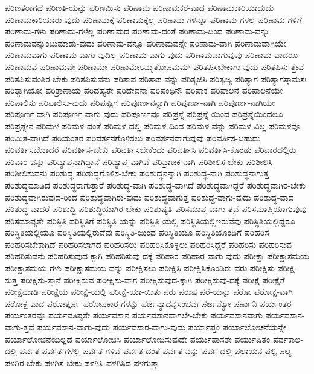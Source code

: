 {ಪರಿಣತರಾಗದೆ
ಪರಿಣತಿ-ಯನ್ನು
ಪರಿಣಮಿಸು
ಪರಿಣಾಮ
ಪರಿಣಾಮಕರ-ವಾದ
ಪರಿಣಾಮಕಾರಿಯಾದುದು
ಪರಿಣಾಮಕಾರಿಯಾರು-ವುದು
ಪರಿಣಾಮಕ್ಕೆ
ಪರಿಣಾಮಕ್ಕೆಲ್ಲ
ಪರಿಣಾಮ-ಗಳನ್ನೂ
ಪರಿಣಾಮ-ಗಳಲ್ಲ
ಪರಿಣಾಮ-ಗಳಿಗೆ
ಪರಿಣಾಮ-ಗಳು
ಪರಿಣಾಮ-ಗಳೆಲ್ಲ
ಪರಿಣಾಮದ
ಪರಿಣಾಮ-ದಂತೆ
ಪರಿಣಾಮ-ದಿಂದ
ಪರಿಣಾಮ-ವನ್ನು
ಪರಿಣಾಮವನ್ನುಂಟುಮಾಡು-ವುದು
ಪರಿಣಾಮ-ವನ್ನೂ
ಪರಿಣಾಮವನ್ನೇ
ಪರಿಣಾಮ-ವಾಗಿ
ಪರಿಣಾಮವಾಗಿಯೇ
ಪರಿಣಾಮವಾಗು
ಪರಿಣಾಮ-ವಾಗು-ವುದಿಲ್ಲ
ಪರಿಣಾಮ-ವಾಗು-ವುದು
ಪರಿಣಾಮವಾಗುವುವು
ಪರಿಣಾಮ-ವಾದರೂ
ಪರಿಣಾಮವೆ
ಪರಿಣಾಮವೇ
ಪರಿಣಾಮೇ
ಪರಿಣಾಮೇಽಮೃತೋಪಮಮ್
ಪರಿತಪಿಸಬೇಕಾಗು-ವುದು
ಪರಿತಪಿಸು-ತ್ತೇವೆ
ಪರಿತಪಿಸುವಂತಿರ-ಬೇಕು
ಪರಿತಪಿಸುವನು
ಪರಿತಾಪ
ಪರಿತಾಪ-ವನ್ನು
ಪರಿತ್ಯಜಿಸಿ
ಪರಿತ್ಯಜ್ಯ
ಪರಿತ್ಯಾಗ
ಪರಿತ್ಯಾಗಸ್ತಾಮಸಃ
ಪರಿತ್ಯಾಗಿಯೋ
ಪರಿತ್ರಾಣಾಯ
ಪರಿದಹ್ಯತೇ
ಪರಿದೇವನಾ
ಪರಿಪಂಥಿನೌ
ಪರಿಪಾಕ
ಪರಿಪಾಲನೆ
ಪರಿಪಾಲನೆಯೇ
ಪರಿಪಾಲಿಸು
ಪರಿಪಾಲಿಸು-ವುದು
ಪರಿಪುಷ್ಟಿಗೆ
ಪರಿಪೂರ್ಣನನ್ನಾಗಿ
ಪರಿಪೂರ್ಣ-ನಾಗಿ
ಪರಿಪೂರ್ಣ-ನಾಗಿಯೇ
ಪರಿಪೂರ್ಣ-ವಾಗಿ
ಪರಿಪೂರ್ಣ-ವಾಗು-ವುದು
ಪರಿಪೂರ್ಣವೂ
ಪರಿಪ್ರಶ್ನೆ
ಪರಿಪ್ರಶ್ನೆ-ಯಿಂದ
ಪರಿಪ್ರಶ್ನೆಯಿಂದಲೂ
ಪರಿಪ್ರಶ್ನೇನ
ಪರಿಮಳ
ಪರಿಮಳ-ದಂತೆ
ಪರಿಮಳ-ದಲ್ಲಿ
ಪರಿಮಳ-ದಿಂದ
ಪರಿಮಳ-ವನ್ನು
ಪರಿಮಳ-ವಿಲ್ಲ
ಪರಿಮಳವೂ
ಪರಿಮಿತ-ವಾಗಿದೆ
ಪರಿಯಂತರ
ಪರಿವರ್ತನಗೊಳಿಸಲು
ಪರಿವರ್ತನವಾಗುವುವು
ಪರಿವರ್ತಿಸ-ಬಹುದು
ಪರಿವರ್ತಿಸಬೇಕಾದರೆ
ಪರಿವರ್ತಿಸ-ಬೇಕು
ಪರಿವರ್ತಿಸಬೇಕೆಂದು
ಪರಿವರ್ತಿಸಿ
ಪರಿವರ್ತಿಸಿ-ಕೊಂಡು
ಪರಿವಾರದಲ್ಲಿರು
ಪರಿವಾರ-ವನ್ನು
ಪರಿವ್ಯಾಪ್ತನಾಗಿದ್ದಾನೆ
ಪರಿವ್ಯಾಪ್ತ-ವಾಗಿವೆ
ಪರಿವ್ರಾಜಕ-ನಾಗಿ
ಪರಿಶೀಲಿಸ-ಬೇಕು
ಪರಿಶೀಲಿಸಿ
ಪರಿಶೀಲಿಸುವನು
ಪರಿಶುದ್ಧ
ಪರಿಶುದ್ಧಗೊಳಿಸ-ಬೇಕು
ಪರಿಶುದ್ಧನನ್ನಾಗಿ
ಪರಿಶುದ್ಧ-ನಾಗಿ
ಪರಿಶುದ್ಧನಾಗುತ್ತ
ಪರಿಶುದ್ಧಮಾಡಿದ
ಪರಿಶುದ್ಧರಾಗುತ್ತಾರೆ
ಪರಿಶುದ್ಧ-ವಾಗಿ
ಪರಿಶುದ್ಧ-ವಾಗಿದೆ
ಪರಿಶುದ್ಧವಾಗಿದ್ದರೆ
ಪರಿಶುದ್ಧವಾಗಿರ-ಬೇಕು
ಪರಿಶುದ್ಧವಾಗಿರುವುದ-ರಿಂದ
ಪರಿಶುದ್ಧವಾಗಿರು-ವುದು
ಪರಿಶುದ್ಧವಾಗುತ್ತ
ಪರಿಶುದ್ಧ-ವಾಗು-ವುದು
ಪರಿಶುದ್ಧ-ವಾದ
ಪರಿಶುದ್ಧ-ವಾದರೆ
ಪರಿಶುದ್ಧಿ
ಪರಿಶುದ್ಧಿಯಾಗಿರ-ಬೇಕು
ಪರಿಶುಷ್ಯತಿ
ಪರಿಸಮಾಪ್ತ-ವಾಗು-ತ್ತವೆ
ಪರಿಸಮಾಪ್ತಿಯಾಗುವುವು
ಪರಿಸಮಾಪ್ಯತೇ
ಪರಿಸ್ಥಿತಿ
ಪರಿಸ್ಥಿತಿಗೆ
ಪರಿಸ್ಥಿತಿ-ಯನ್ನು
ಪರಿಸ್ಥಿತಿ-ಯಲ್ಲಿ
ಪರಿಸ್ಥಿತಿಯಲ್ಲಿಇರುವೆವು
ಪರಿಸ್ಥಿತಿಯಲ್ಲಿದ್ದರೂ
ಪರಿಸ್ಥಿತಿಯಲ್ಲಿಯೂ
ಪರಿಸ್ಥಿತಿಯಲ್ಲಿರುವೆವು
ಪರಿಸ್ಥಿತಿ-ಯಿಂದ
ಪರಿಸ್ಥಿತಿಯೂ
ಪರಿಸ್ಥಿತಿಯೊಂದಿಗೆ
ಪರಿಹರಿಸ
ಪರಿಹರಿಸಬೇಕಾಗಿದೆ
ಪರಿಹರಿಸಲಾಗದ
ಪರಿಹರಿಸಲು
ಪರಿಹರಿಸಿಕೊಳ್ಳಲು
ಪರಿಹರಿಸಿದ್ದರೆ
ಪರಿಹರಿಸು
ಪರಿಹರಿಸುವ
ಪರಿಹರಿಸುವನು
ಪರಿಹರಿಸುವುದ-ಕ್ಕಾಗಿ
ಪರಿಹರಿಸುವು-ದಕ್ಕೆ
ಪರಿಹಾರ
ಪರಿಹಾರ-ವಾಗು-ವುದು
ಪರೀಕ್ಷಾ
ಪರೀಕ್ಷಾಸಮಯ
ಪರೀಕ್ಷಾಸಮಯ-ಗಳು
ಪರೀಕ್ಷಾಸಮಯ-ವನ್ನು
ಪರೀಕ್ಷಿಸಲು
ಪರೀಕ್ಷಿಸಿ
ಪರೀಕ್ಷಿಸಿಕೊಂಡಿರು-ವರು
ಪರೀಕ್ಷಿಸು
ಪರೀಕ್ಷಿ-ಸುತ್ತ
ಪರೀಕ್ಷಿಸು-ತ್ತಾನೆ
ಪರೀಕ್ಷಿಸುವ
ಪರೀಕ್ಷಿಸು-ವಾಗ
ಪರೀಕ್ಷಿಸುವುದ-ಕ್ಕಾಗಿ
ಪರೀಕ್ಷಿಸುವು-ದಕ್ಕೆ
ಪರೀಕ್ಷೆ
ಪರೀಕ್ಷೆಗೆ
ಪರೀಕ್ಷೆಮಾಡಿ
ಪರೀಕ್ಷೆಯ
ಪರೀಕ್ಷೆ-ಯಲ್ಲಿ
ಪರೀಕ್ಷೆ-ಯಾ-ಯಿತು
ಪರು
ಪರುಷ
ಪರೆ-ಯನ್ನು
ಪರೋ
ಪರೋಕ್ಷ-ವಾಗಿ
ಪರೋಕ್ಷ-ವಾದ
ಪರೋತ್ಕರ್ಷ
ಪರೋಪಕಾರ-ಗಳನ್ನು
ಪರ್ಜನ್ಯಾದನ್ನಸಂಭವಃ
ಪರ್ಜನ್ಯೋ
ಪರ್ಣಾನಿ
ಪರ್ಯಂತರ
ಪರ್ಯಂತರವೂ
ಪರ್ಯವತಿಷ್ಠತೇ
ಪರ್ಯವಸಾನ
ಪರ್ಯವಸಾನವಾಗಲೇ-ಬೇಕು
ಪರ್ಯವಸಾನವಾಗು
ಪರ್ಯವಸಾನ-ವಾಗು-ತ್ತವೆ
ಪರ್ಯವಸಾನ-ವಾಗು-ವುದು
ಪರ್ಯವಸಾರ-ವಾಗು-ವುದು
ಪರ್ಯಾಪ್ತಂ
ಪರ್ಯಾಲೋಚನೆಯನ್ನೇ
ಪರ್ಯಾಲೋಚನೆಯಿಲ್ಲದೆ
ಪರ್ಯಾಲೋಚಿಸಿ
ಪರ್ಯಾಲೋಚಿಸುವುದೇ
ಪರ್ಯುಪಾಸತೇ
ಪರ್ಯುಷಿತಂ
ಪರ್ವಕಾಲ-ದಲ್ಲಿ
ಪರ್ವತ
ಪರ್ವತ-ಗಳಲ್ಲಿ
ಪರ್ವತ-ಗಳಿವೆ
ಪರ್ವತ-ದಂತೆ
ಪರ್ವತ-ವನ್ನು
ಪರ್ವ-ದಲ್ಲಿ
ಪಲಾಯನ
ಪಲ್ಟಿ
ಪಲ್ಯ
ಪಳಗಿರ-ಬೇಕು
ಪಳಗಿಸ-ಬೇಕು
ಪಳಗಿಸಿ
ಪಳಗಿಸಿದ
ಪಳಗುತ್ತಾ
}
